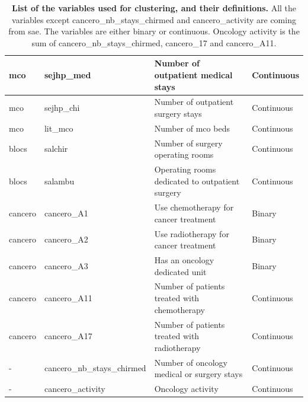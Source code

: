 \begin{table}[h!]
{\begin{tabular}{|l|l|l|l|}
            \acs{mco}                & sejhp\_med                  & Number of outpatient medical stays              & Continuous            \\ \hline
            \acs{mco}                & sejhp\_chi                  & Number of outpatient surgery stays              & Continuous            \\ \hline
            \acs{mco}                & lit\_mco                    & Number of \acs{mco} beds                        & Continuous            \\ \hline
            blocs                    & salchir                     & Number of surgery operating rooms               & Continuous            \\ \hline
            blocs                    & salambu                     & Operating rooms dedicated to outpatient surgery & Continuous            \\ \hline
            cancero                  & cancero\_A1                 & Use chemotherapy for cancer treatment           & Binary                \\ \hline
            cancero                  & cancero\_A2                 & Use radiotherapy for cancer treatment           & Binary                \\ \hline
            cancero                  & cancero\_A3                 & Has an oncology dedicated unit                  & Binary                \\ \hline
            cancero                  & cancero\_A11                & Number of patients treated with chemotherapy    & Continuous            \\ \hline
            cancero                  & cancero\_A17                & Number of patients treated with radiotherapy    & Continuous            \\ \hline
            -                        & cancero\_nb\_stays\_chirmed & Number of oncology medical or surgery stays     & Continuous            \\ \hline
            -                        & cancero\_activity           & Oncology activity                               & Continuous            \\ \hline
        \end{tabular}}
    \caption{
        \textbf{List of the variables used for clustering, and their definitions.}
        All the variables except
        cancero\_nb\_stays\_chirmed and cancero\_activity are coming from \ac{sae}.
        The variables are either binary or continuous. Oncology activity is the sum
        of cancero\_nb\_stays\_chirmed, cancero\_17 and cancero\_A11.
    }
    \label{table:sae-variables}
\end{table}

